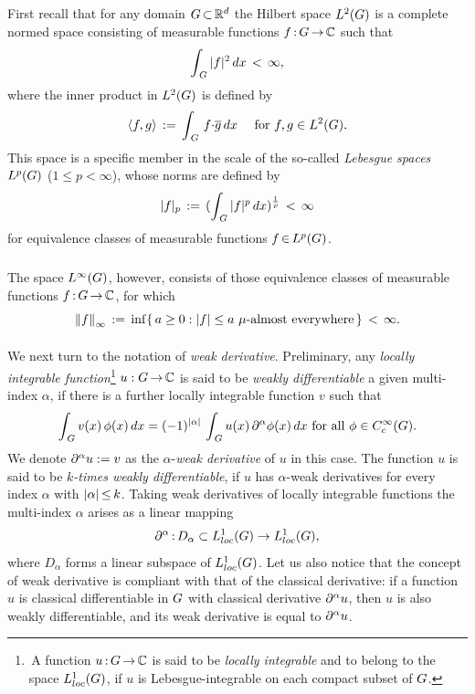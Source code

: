 \documentclass[11pt,twoside]{article}
\begin{document}
\begin{itemize}[leftmargin=4mm]
\subparagraph{} %
First recall that
for any domain $G {\,\subset\,} {\mathbb{R}}^d$
the Hilbert space $L^2(G)$ is a complete normed space
consisting of measurable functions $f {\,:\,} G {\,\to\,} {\mathbb{C}}$ such that
\[
\int_{\,\G} \, \abs{f} ^2 \, dx \, < \, \infty,
\]
where the inner product in $L^2(G)$ is defined by
\[
\langle f,g \rangle \,:=\, \int_{\,G} \, f {\cdot} \overline{g} \, dx
\quad \mbox{ for } f,g \in L^2(G).
\]
This space is a specific member in the scale of the so-called
\textit{Lebesgue spaces} $L^p(G)$ ($1 \leq p < \infty$),
whose norms are defined by
\[
\abs{f} _p \eqdef ( \int_{\,\G} \, \abs{f} ^p \, dx)^{\frac{1}{p}} \,<\,\infty
\]
for equivalence classes of measurable functions $f {\,\in\,} L^p(G)$.

\subparagraph{}
The space $L^{\infty}(G)$,
however,
consists of those equivalence classes of 
measurable functions $f {\,:\,} G {\,\to\,} {\mathbb{C}}$,
for which 
\[
\norm{f}_{\infty} \eqdef \inf
\{\,a \geq 0: \abs{f} \leq a \,\, \mu \mbox{-almost everywhere}\,\}
\,<\,\infty.
\]

\paragraph{} %
We next turn to the notation of \textit{weak derivative}.
Preliminary,
any \textit{locally integrable function}\footnote{
\,A function $u{\,:\,}G {\,\to\,} {\mathbb{C}}$ is said to be \textit{locally integrable}
and to belong to the space $L_{loc}^1(G)$,
if $u$ is Lebesgue-integrable on each compact subset of $G$.}
$u:G {\,\to\,} {\mathbb{C}}$ is said to be \textit{weakly differentiable} 
{\wrt} a given multi-index $\alpha$,
if there is a further locally integrable function $v$ such that
\[
\int_{\,\G} v(x) \, \phi(x) \, dx
=
(-1)^{ \abs{\alpha} } \, \int_{\,\G} u(x) \, \PA \phi(x) \, dx
\fa \phi \in \TF.
\]
We denote $\partial^{\alpha} u := v$ as the $\alpha$-\textit{weak derivative} of $u$
in this case.
The function $u$ is said to be \textit{$k$-times weakly differentiable},
if $u$ has $\alpha$-weak derivatives
for every index $\alpha$ with $\abs{\alpha} \,{\leq}\, k$.
Taking weak derivatives of locally integrable functions {\wrt} the multi-index
$\alpha$ arises as a linear mapping
\[
\partial^{\alpha} {\,:\,} D_{\alpha} \subset L_{loc}^1(G) \to L_{loc}^1(G),
\]
where $D_{\alpha}$ forms a linear subspace of $L_{loc}^1(G)$.
Let us also notice that
the concept of weak derivative is compliant
with that of the classical derivative:
if a function $u$ is classical differentiable in $G$
with classical derivative $\partial^{\alpha} u$,
then $u$ is also weakly differentiable,
and its weak derivative is equal to $\partial^{\alpha} u$.


\end{itemize}
\end{document}
